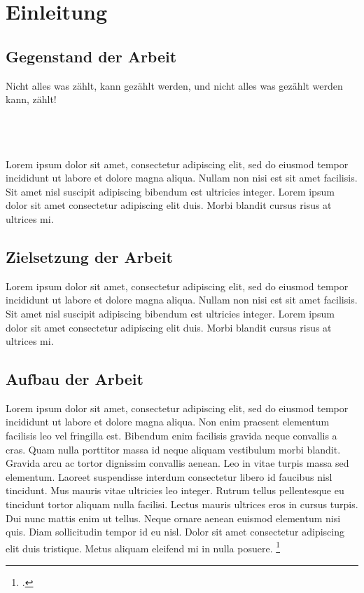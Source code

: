 \section{Einleitung}\label{einleitung}\thispagestyle{FooBar}
\subsection{Gegenstand der Arbeit}
\begin{itshape}\au Nicht alles was zählt, kann gezählt werden, und nicht alles was gezählt werden
kann, zählt!\ao\end{itshape}  
\\\\
\\
Lorem ipsum dolor sit amet, consectetur adipiscing elit, sed do eiusmod tempor incididunt ut labore et dolore magna aliqua. Nullam non nisi est sit amet facilisis. Sit amet nisl suscipit adipiscing bibendum est ultricies integer. Lorem ipsum dolor sit amet consectetur adipiscing elit duis. Morbi blandit cursus risus at ultrices mi. \textcite[20]{Balzert.2009}
\subsection{Zielsetzung der Arbeit}
Lorem ipsum dolor sit amet, consectetur adipiscing elit, sed do eiusmod tempor incididunt ut labore et dolore magna aliqua. Nullam non nisi est sit amet facilisis. Sit amet nisl suscipit adipiscing bibendum est ultricies integer. Lorem ipsum dolor sit amet consectetur adipiscing elit duis. Morbi blandit cursus risus at ultrices mi.
\subsection{Aufbau der Arbeit}
Lorem ipsum dolor sit amet, consectetur adipiscing elit, sed do eiusmod tempor incididunt ut labore et dolore magna aliqua. Non enim praesent elementum facilisis leo vel fringilla est. Bibendum enim facilisis gravida neque convallis a cras. Quam nulla porttitor massa id neque aliquam vestibulum morbi blandit. Gravida arcu ac tortor dignissim convallis aenean. Leo in vitae turpis massa sed elementum. Laoreet suspendisse interdum consectetur libero id faucibus nisl tincidunt. Mus mauris vitae ultricies leo integer. Rutrum tellus pellentesque eu tincidunt tortor aliquam nulla facilisi. Lectus mauris ultrices eros in cursus turpis. Dui nunc mattis enim ut tellus. Neque ornare aenean euismod elementum nisi quis. Diam sollicitudin tempor id eu nisl. Dolor sit amet consectetur adipiscing elit duis tristique. Metus aliquam eleifend mi in nulla posuere.
\footcite[10]{Vogel.2005}